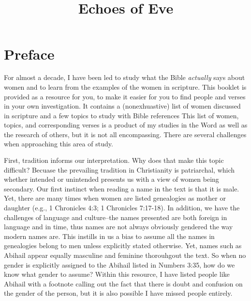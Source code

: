 \documentclass[12pt,letter,twoside,openany]{extbook}
\title{Echoes of Eve}
\date{}
\author{}
\begin{document}
\frontmatter
\maketitle
\tableofcontents

\chapter*{Preface}
For almost a decade, I have been led to study what the Bible \textit{actually} says about women and to learn from the examples of the women in scripture. This booklet is provided as a resource for you, to make it easier for you to find people and verses in your own investigation. It contains a (nonexhuastive) list of women discussed in scripture and a few topics to study with Bible references  This list of women, topics, and corresponding verses is a product of my studies in the Word as well as the research of others, but it is not all encompassing. There are several challenges when approaching this area of study.

First, tradition informs our interpretation. Why does that make this topic difficult? Becuase the prevailing tradition in Christianity is patriarchal, which whether intended or unintended presents us with a view of women being secondary. Our first instinct when reading a name in the text is that it is male. Yet, there are many times when women are listed genealogies as mother or daughter (e.g., 1 Chronicles 4:3; 1 Chronicles 7:17-18). In addition, we have the challenges of language and culture--the names presented are both foreign in language and in time, thus names are not always obviously gendered the way modern names are. This instills in us a bias to assume all the names in genealogies belong to men unless explicitly stated otherwise. Yet, names such as Abihail appear equally masculine and feminine thorouhgout the text. So when no gender is explicitly assigned to the Abihail listed in Numbers 3:35, how do we know what gender to assume? Within this resource, I have listed people like Abihail with a footnote calling out the fact that there is doubt and confusion on the gender of the person, but it is also possible I have missed people entirely.
\end{document}
